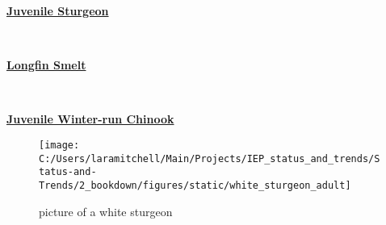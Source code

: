 \documentclass[
]{book}
\begin{document}
\begin{panel-grid}

\begin{columns-nocenter}

\begin{column800}

\textbf{\href{http://calfish.ucdavis.edu/species/?uid=182\&ds=698}{Juvenile Sturgeon}}

\end{column800}

\begin{column40}

~

\end{column40}

\begin{column800}

\textbf{\href{http://calfish.ucdavis.edu/species/?uid=87\&ds=698}{Longfin Smelt}}

\end{column800}

\begin{column40}

~

\end{column40}

\begin{column800}

\textbf{\href{http://calfish.ucdavis.edu/species/?uid=30\&ds=698}{Juvenile Winter-run Chinook}}

\end{column800}

\end{columns-nocenter}

\begin{columns-nocenter}

\begin{column800}

\begin{figure}

{\centering \texttt{[image: C:/Users/laramitchell/Main/Projects/IEP\_status\_and\_trends/Status-and-Trends/2\_bookdown/figures/static/white\_sturgeon\_adult]} 

}

\caption{picture of a white sturgeon}\label{fig:unnamed-chunk-170}
\end{figure}

\end{column800}

\begin{column40}


\end{column40}
\end{columns-nocenter}
\end{panel-grid}
\end{document}
